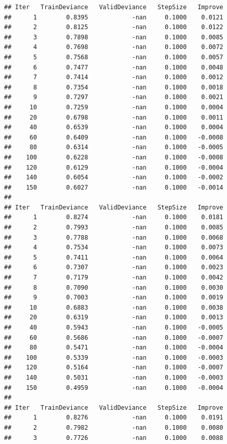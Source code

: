 \documentclass[
]{book}
\begin{document}
\begin{verbatim}
## Iter   TrainDeviance   ValidDeviance   StepSize   Improve
##      1        0.8395            -nan     0.1000    0.0121
##      2        0.8125            -nan     0.1000    0.0122
##      3        0.7898            -nan     0.1000    0.0085
##      4        0.7698            -nan     0.1000    0.0072
##      5        0.7568            -nan     0.1000    0.0057
##      6        0.7477            -nan     0.1000    0.0048
##      7        0.7414            -nan     0.1000    0.0012
##      8        0.7354            -nan     0.1000    0.0018
##      9        0.7297            -nan     0.1000    0.0021
##     10        0.7259            -nan     0.1000    0.0004
##     20        0.6798            -nan     0.1000    0.0011
##     40        0.6539            -nan     0.1000    0.0004
##     60        0.6409            -nan     0.1000   -0.0008
##     80        0.6314            -nan     0.1000   -0.0005
##    100        0.6228            -nan     0.1000   -0.0008
##    120        0.6129            -nan     0.1000   -0.0004
##    140        0.6054            -nan     0.1000   -0.0002
##    150        0.6027            -nan     0.1000   -0.0014
## 
## Iter   TrainDeviance   ValidDeviance   StepSize   Improve
##      1        0.8274            -nan     0.1000    0.0181
##      2        0.7993            -nan     0.1000    0.0085
##      3        0.7788            -nan     0.1000    0.0068
##      4        0.7534            -nan     0.1000    0.0073
##      5        0.7411            -nan     0.1000    0.0064
##      6        0.7307            -nan     0.1000    0.0023
##      7        0.7179            -nan     0.1000    0.0042
##      8        0.7090            -nan     0.1000    0.0030
##      9        0.7003            -nan     0.1000    0.0019
##     10        0.6883            -nan     0.1000    0.0038
##     20        0.6319            -nan     0.1000    0.0013
##     40        0.5943            -nan     0.1000   -0.0005
##     60        0.5686            -nan     0.1000   -0.0007
##     80        0.5471            -nan     0.1000   -0.0004
##    100        0.5339            -nan     0.1000   -0.0003
##    120        0.5164            -nan     0.1000   -0.0007
##    140        0.5031            -nan     0.1000   -0.0003
##    150        0.4959            -nan     0.1000   -0.0004
## 
## Iter   TrainDeviance   ValidDeviance   StepSize   Improve
##      1        0.8276            -nan     0.1000    0.0191
##      2        0.7982            -nan     0.1000    0.0080
##      3        0.7726            -nan     0.1000    0.0088

\end{verbatim}
\end{document}
